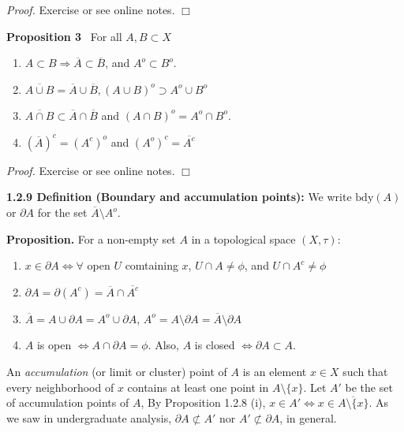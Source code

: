 \documentclass[12pt]{article}
\newcommand{\rimply}[0] { \Rightarrow }
\newcommand{\lrimply}[0] { \Leftrightarrow }
\begin{document}
\begin{flushleft}
\begin{enumerate}
            \end{enumerate}\begin{flushleft}
 \emph{Proof.  }Exercise or see online notes. $\Box$ \end{flushleft}\end{flushleft}\begin{flushleft}
 { \bf Proposition  3 } \  For all $A, B \subset X$\begin{enumerate}
\item
                $A \subset B \rimply \overline{A} \subset \overline{B}$, and $A^o \subset B^o$.
            \item
                $\overline{A \cup B} = \overline{A} \cup \overline{B}, ( A \cup B )^o \supset A^o \cup  B^o$
            \item
                $\overline{A \cap B} \subset \overline{A} \cap \overline{B}$ and $ (A \cap B)^o = A^o \cap B^o$.
            \item
                $(\overline{A})^c = (A^c)^o$ and $(A^o)^c = \overline{A^c}$
            \end{enumerate}\begin{flushleft}
 \emph{Proof.  }Exercise or see online notes. $\Box$
\end{flushleft}\end{flushleft}\begin{flushleft}
 { \bf 1.2.9 Definition (Boundary and accumulation points):} We write
 $\textrm{bdy}(A)$ or $\partial A$ for the set
$\overline{A} \setminus A^o$.
\end{flushleft}\begin{flushleft}
 { \bf Proposition. }For a non-empty set $A$ in a topological space $(X, \tau)$:\begin{enumerate}[i]
\item
                $x \in \partial A \lrimply \forall $ open $U$ comtaining $x$, $U \cap A \not = \phi$, and $U \cap A^c \not = \phi$
            \item
                $\partial A = \partial (A ^c) = \overline{A} \cap \overline{A^c}$
            \item
                $\overline{A} = A \cup \partial A = A^o \cup \partial A$, $A^o = A \setminus \partial A = \overline{A} \setminus \partial A$
            \item
                $A$ is open $\lrimply A \cap \partial A = \phi$.
Also, $A$ is closed $\lrimply \partial A \subset A$.
            \end{enumerate}
An {\em accumulation} (or limit or cluster) point of $A$ is an
element $x \in X$ such that every neighborhood of $x$ contains at least one point in $A \setminus \{ x \}$.
Let $A'$ be the set of accumulation points of $A$, By Proposition 1.2.8
(i), $x \in A' \lrimply x \in \overline{ A \setminus \{ x \}}$. As we saw in undergraduate analysis, $\partial A \not \subset A'$ nor $A' \not \subset \partial A$, in general.\end{flushleft}\begin{flushleft}


\end{flushleft}
\end{document}
